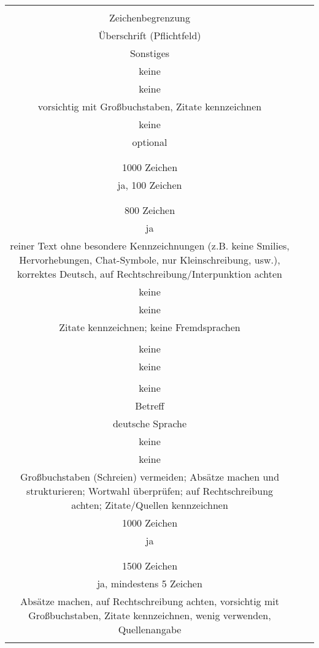 \begin{landscape}
\begin{tabular}{ccc}
{		
Kommentar: formale Regeln\\
Zeichenbegrenzung\\
Überschrift (Pflichtfeld)\\
Sonstiges 
&		%
		\\
		keine\\
		keine\\
		vorsichtig mit Großbuchstaben, Zitate kennzeichnen	
		&
		\\
		keine\\
		optional\\
		\\
		&
		\\
		1000 Zeichen\\
		ja, 100 Zeichen\\
		\\
		&
		\\
		800 Zeichen\\
		ja\\
		reiner Text ohne besondere Kennzeichnungen (z.B. keine Smilies, Hervorhebungen, Chat-Symbole, nur Kleinschreibung, usw.), korrektes Deutsch, auf Rechtschreibung/Interpunktion achten
		&
		\\
		keine\\
		keine\\
		Zitate kennzeichnen; keine Fremdsprachen\\
		&
		\\
		keine\\
		keine\\
		&
		\\
		keine\\
		Betreff\\
		deutsche Sprache
		&
		\\
		keine\\
		keine\\
		Großbuchstaben (Schreien) vermeiden; Absätze machen und strukturieren; Wortwahl überprüfen; auf Rechtschreibung achten; 				Zitate/Quellen kennzeichnen
		&
		\\
		1000 Zeichen\\
		ja\\
		\\
		&
		\\
		1500 Zeichen\\
		ja, mindestens 5 Zeichen\\
		Absätze machen, auf Rechtschreibung achten, vorsichtig mit Großbuchstaben, Zitate kennzeichnen, wenig verwenden, Quellenangabe\\
}
\end{tabular}
\end{landscape}
